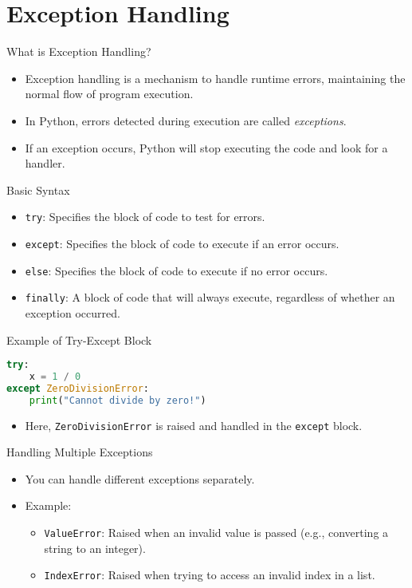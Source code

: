 \section*{Exception Handling}

\begin{frame}{What is Exception Handling?}
\begin{itemize}
    \item Exception handling is a mechanism to handle runtime errors, maintaining the normal flow of program execution.
    \item In Python, errors detected during execution are called \textit{exceptions}.
    \item If an exception occurs, Python will stop executing the code and look for a handler.
\end{itemize}
\end{frame}

\begin{frame}[allowframebreaks]{Basic Syntax}
\begin{itemize}
    \item \texttt{try}: Specifies the block of code to test for errors.
    \item \texttt{except}: Specifies the block of code to execute if an error occurs.
    \item \texttt{else}: Specifies the block of code to execute if no error occurs.
    \item \texttt{finally}: A block of code that will always execute, regardless of whether an exception occurred.
\end{itemize}
\end{frame}


\begin{frame}[fragile]{Example of Try-Except Block}
\begin{lstlisting}[language=Python]
try:
    x = 1 / 0
except ZeroDivisionError:
    print("Cannot divide by zero!")
\end{lstlisting}
\begin{itemize}
\item Here, \texttt{ZeroDivisionError} is raised and handled in the \texttt{except} block.
\end{itemize}
\end{frame}


\begin{frame}{Handling Multiple Exceptions}
\begin{itemize}
\item You can handle different exceptions separately.
\item Example:
\begin{itemize}
    \item \texttt{ValueError}: Raised when an invalid value is passed (e.g., converting a string to an integer).
    \item \texttt{IndexError}: Raised when trying to access an invalid index in a list.
\end{itemize}
\end{itemize}
\end{frame}

